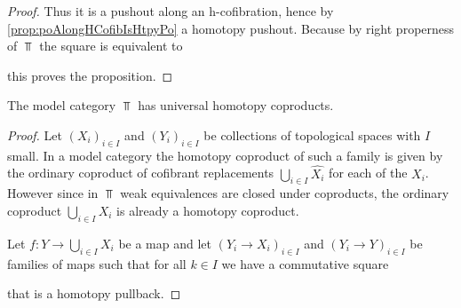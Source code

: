\begin{prop}
\begin{proof}
        Thus it is a pushout along an h-cofibration, hence by \cref{prop:poAlongHCofibIsHtpyPo} a homotopy pushout.
        Because by right properness of $\Top$ the square is equivalent to 
        \begin{center}
        \end{center}
        this proves the proposition.
    \end{proof}
\end{prop}
\begin{lemma}\label{lem:topUniversalCoproduct}
    The model category $\Top$ has universal homotopy coproducts.
    \begin{proof}
        	Let $\left(X_i\right)_{i\in I}$ and $\left(Y_i\right)_{i\in I}$ be collections of topological spaces with $I$ small. 
            In a model category the homotopy coproduct of such a family is given by the ordinary coproduct of cofibrant replacements $\bigcup\limits_{i\in I}\widehat{X_i}$ for each of the $X_i$.
            However since in $\Top$ weak equivalences are closed under coproducts, the ordinary coproduct $\bigcup\limits_{i\in I}X_i$ is already a homotopy coproduct.

            Let $f\colon Y\to\bigcup\limits_{i\in I}X_i$ be a map and let $\left(Y_i\to X_i\right)_{i\in I}$ and $\left(Y_i\to Y\right)_{i\in I}$ be families of maps such that for all $k\in I$ we have a commutative square
            \begin{center}
            \end{center}
            that is a homotopy pullback.


\end{proof}
\end{lemma}
